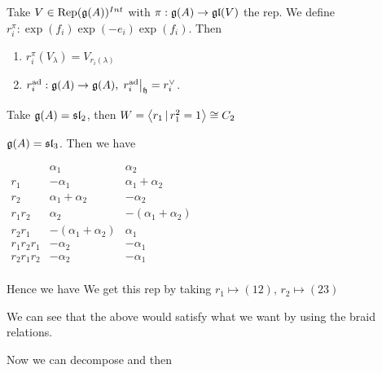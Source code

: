 \documentclass{article}
\begin{document}
\begin{theorem}
Take $V \in \operatorname{Rep}(\mathfrak{g}(A))^{Int}$ with $\pi: \mathfrak{g}(A) \to \mathfrak{gl}(V)$ the rep. We define $r_i^\pi : \exp(f_i) \exp(-e_i) \exp(f_i)$. Then 
\begin{enumerate}
    \item $r_i^\pi(V_\lambda) = V_{r_i(\lambda)}$
    \item $r_i^{\operatorname{ad}} : \mathfrak{g}(A) \to \mathfrak{g}(A), \, \left. r_i^{\operatorname{ad}} \right\rvert_{\mathfrak{h}} = r_i^\vee$.  
\end{enumerate}
\end{theorem}

\begin{example}
Take $\mathfrak{g}(A) = \mathfrak{sl}_2$, then $W = \left\langle r_1 \, | \, r_1^2 = 1 \right\rangle \cong C_2$
\end{example}

\begin{example}
$\mathfrak{g}(A) = \mathfrak{sl}_3$. Then we have
\begin{center}
    $\begin{array}{c|c|c}
    & \alpha_1 & \alpha_2 \\ \hline \hline
r_1 &  -\alpha_1  & \alpha_1 + \alpha_2 \\ \hline 
r_2 & \alpha_1 + \alpha_2 & -\alpha_2 \\ \hline 
r_1 r_2 & \alpha_2 & -(\alpha_1 + \alpha_2) \\ \hline 
r_2 r_1 & -(\alpha_1 + \alpha_2) & \alpha_1 \\ \hline 
r_1 r_2 r_1 & -\alpha_2 & -\alpha_1 \\ \hline 
r_2 r_1 r_2 & -\alpha_2 & -\alpha_1 \\ 
    \end{array}$
\end{center}
Hence we have 
We get this rep by taking $r_1 \mapsto (12), \, r_2 \mapsto (23)$

\begin{remark}
We can see that the above would satisfy what we want by using the braid relations. 
\end{remark}

Now we can decompose 
and then 
\end{example}
\end{document}

